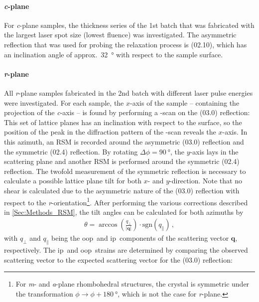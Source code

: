 \paragraph{\textit{c}-plane}
    For \textit{c}-plane samples, the thickness series of the 1st batch that was fabricated with the largest laser spot size (lowest fluence) was investigated.
    The asymmetric reflection that was used for probing the relaxation process is (02.10), which has an inclination angle of approx.\ \qty{32}{\degree} with respect to the sample surface.
\paragraph{\textit{r}-plane}
    All \textit{r}-plane samples fabricated in the 2nd batch with different laser pulse energies were investigated.
    For each sample, the $x$-axis of the sample -- containing the projection of the \textit{c}-axis -- is found by performing a \textphi-scan on the (03.0) reflection:
    This set of lattice planes has an inclination with respect to the surface, so the position of the peak in the diffraction pattern of the \textphi-scan reveals the $x$-axis.
    In this azimuth, an \gls{RSM} is recorded around the asymmetric (03.0) reflection and the symmetric (02.4) reflection.
    By rotating $\Delta\phi=\qty{90}{\degree}$, the $y$-axis lays in the scattering plane and another \gls{RSM} is performed around the symmetric (02.4) reflection.
    The twofold measurement of the symmetric reflection is necessary to calculate a possible lattice plane tilt for both $x$- and $y$-direction.
    Note that no shear is calculated due to the asymmetric nature of the (03.0) reflection with respect to the \textit{r}-orientation\footnote{
        For \textit{m}- and \textit{a}-plane rhombohedral structures, the crystal is symmetric under the transformation $\phi\rightarrow\phi+\qty{180}{\degree}$, which is not the case for \textit{r}-plane.
    }.
    After performing the various corrections described in \ref{Sec:Methods_RSM}, the tilt angles can be calculated for both azimuths by
    \begin{eqnarray}
        \theta = \arccos\left(
            \frac{q_\perp}{|\mathbf{q}|}
        \right) \cdot\mathrm{sgn}\left(q_\parallel\right)\,,
        \label{Equ:Results_3_tiltAngle}
    \end{eqnarray}
    with $q_\perp$ and $q_\parallel$ being the \gls{oop}\ and \gls{ip}\ components of the scattering vector $\mathbf{q}$, respectively.
    The \gls{ip}\ and \gls{oop}\ strains are determined by comparing the observed scattering vector to the expected scattering vector for the (03.0) reflection:
